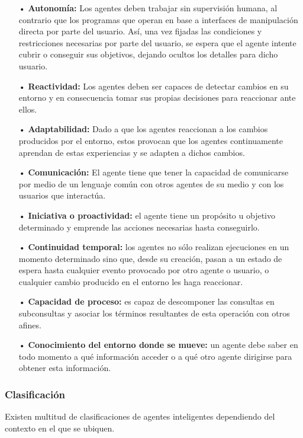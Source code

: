 \begin{itemize}
\item[•] {\bf Autonomía:} Los agentes deben trabajar sin supervisión humana, al contrario que los programas que operan en base a interfaces de manipulación directa por parte del usuario. Así, una vez fijadas las condiciones y restricciones necesarias por parte del usuario, se espera que el agente intente cubrir o conseguir sus objetivos, dejando ocultos los detalles para dicho usuario.

\item[•] {\bf Reactividad:} Los agentes deben ser capaces de detectar cambios en su entorno y en consecuencia tomar sus propias decisiones para reaccionar ante ellos.

\item[•] {\bf Adaptabilidad:} Dado a que los agentes reaccionan a los cambios producidos por el entorno, estos provocan que los agentes continuamente aprendan de estas experiencias y se adapten a dichos cambios.

\item[•] {\bf Comunicación:} El agente tiene que tener la capacidad de comunicarse por medio de un lenguaje común con otros agentes de su medio y con los usuarios que interactúa.

\item[•] {\bf Iniciativa o proactividad:} el agente tiene un propósito u objetivo determinado y emprende las acciones necesarias hasta conseguirlo.

\item[•] {\bf Continuidad temporal:} los agentes no sólo realizan ejecuciones en un momento determinado sino que, desde su creación, pasan a un estado de espera hasta cualquier evento provocado por otro agente o usuario, o cualquier cambio producido en el entorno les haga reaccionar. 

\item[•] {\bf Capacidad de proceso:} es capaz de descomponer las consultas en subconsultas y asociar los términos resultantes de esta operación con otros afines.

\item[•] {\bf Conocimiento del entorno donde se mueve:} un agente debe saber en todo momento a qué información acceder o a qué otro agente dirigirse para obtener esta información.

\end{itemize}

\subsubsection{Clasificación}
Existen multitud de clasificaciones de agentes inteligentes dependiendo del contexto en el que se ubiquen.

